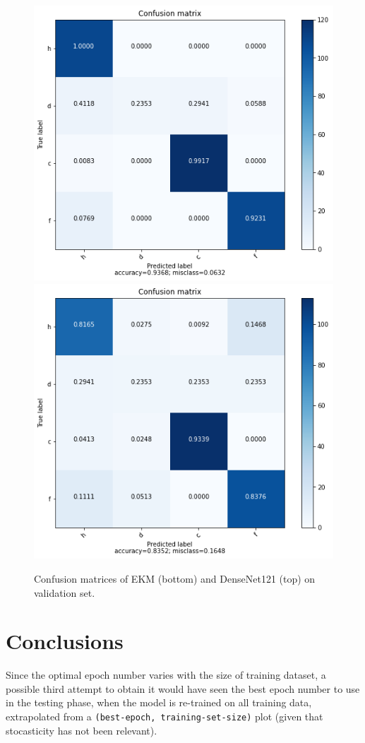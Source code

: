 \documentclass[aps,twocolumn,secnumarabic,nobalancelastpage,amsmath,amssymb,
nofootinbib]{revtex4}
\begin{document}
\begin{figure}[h]
	\centering
	\includegraphics[width=0.7\linewidth]{Images/ConfusionMatrixDenseNet121}
	\includegraphics[width=0.7\linewidth]{Images/ConfusionMatrixEKM}
	\caption{Confusion matrices of EKM (bottom) and DenseNet121 (top) on validation set.}
	\label{fig:confusionmatrixdensenet121}
\end{figure}


\section{Conclusions}\label{conclusions}

Since the optimal epoch number varies with the size of training dataset,
a possible third attempt to obtain it would have seen the best epoch
number to use in the testing phase, when the model is re-trained on all
training data, extrapolated from a \texttt{(best-epoch,\ training-set-size)} plot (given that stocasticity has not been relevant). 
\end{document}
